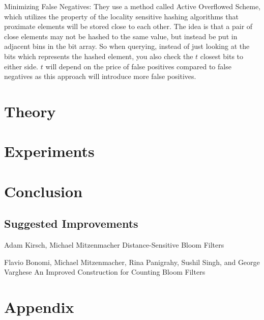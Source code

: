 \documentclass[a4paper,11pt]{article}
\begin{document}
Minimizing False Negatives:
They use a method called Active Overflowed Scheme, which utilizes the property of the locality sensitive hashing algorithms that proximate elements will be stored close to each other. The idea is that a pair of close elements may not be hashed to the same value, but instead be put in adjacent bins in the bit array. So when querying, instead of just looking at the bits which represents the hashed element, you also check the $t$ closest bits to either side. $t$ will depend on the price of false positives compared to false negatives as this approach will introduce more false positives.

\section{Theory} %




\section{Experiments}



\section{Conclusion}
\subsection{Suggested Improvements}

\newpage

\begin{thebibliography}{}

Adam Kirsch, Michael Mitzenmacher
Distance-Sensitive Bloom Filters

Flavio Bonomi, Michael Mitzenmacher, Rina Panigrahy, Sushil Singh, and George Varghese
An Improved Construction for Counting Bloom Filters

\end{thebibliography}

\section*{Appendix}
%
\end{document}
